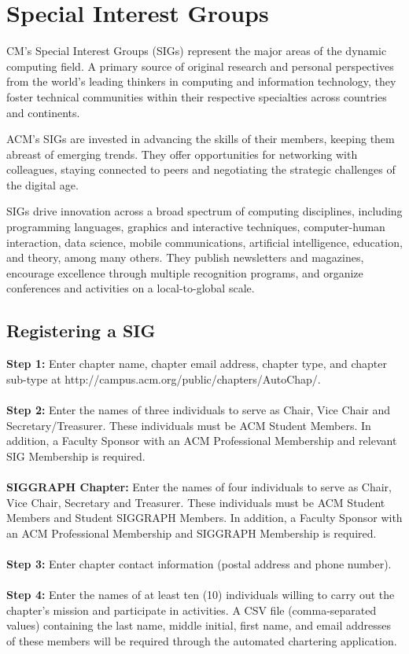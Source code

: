 %
%
\let\textcircled=\pgftextcircled
\chapter{Special Interest Groups}
\label{chap:SIGs}

CM's Special Interest Groups (SIGs) represent the major areas of the dynamic computing field.  A primary source of original research and personal perspectives from the world's leading thinkers in computing and information technology, they foster technical communities within their respective specialties across countries and continents.

ACM's SIGs are invested in advancing the skills of their members, keeping them abreast of emerging trends. They offer opportunities for networking with colleagues, staying connected to peers and negotiating the strategic challenges of the digital age.

SIGs drive innovation across a broad spectrum of computing disciplines, including programming languages, graphics and interactive techniques, computer-human interaction, data science, mobile communications, artificial intelligence, education, and theory, among many others. They publish newsletters and magazines, encourage excellence through multiple recognition programs, and organize conferences and activities on a local-to-global scale.


\section{Registering a SIG}
\label{sec:sec01}

\textbf{Step 1:}  Enter chapter name, chapter email address, chapter type, and chapter sub-type at http://campus.acm.org/public/chapters/AutoChap/.
\\
\\
\textbf{Step 2:}  Enter the names of three individuals to serve as Chair, Vice Chair and Secretary/Treasurer. These individuals must be ACM Student Members. In addition, a Faculty Sponsor with an  ACM  Professional Membership and relevant SIG Membership is required. 
\\
\\
\textbf{SIGGRAPH Chapter:}  Enter the names of four individuals to serve as Chair, Vice Chair, Secretary and Treasurer. These individuals must be ACM Student Members and Student SIGGRAPH Members. In addition, a Faculty Sponsor with an ACM Professional Membership and SIGGRAPH Membership is required.
\\
\\
\textbf{Step 3:}  Enter chapter contact information (postal address and phone number).
\\
\\
\textbf{Step 4:}  Enter the names of at least ten (10) individuals willing to carry out the chapter's mission and participate in activities.  A CSV file (comma-separated values) containing the last name, middle initial, first name, and email addresses of these members will be required through the automated chartering application.

